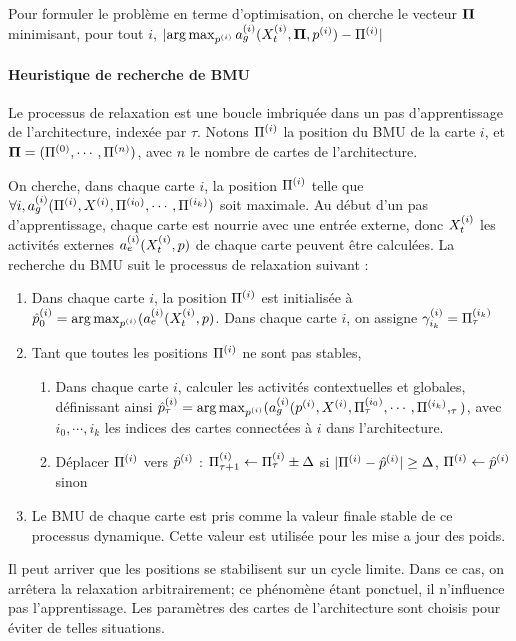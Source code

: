 Pour formuler le problème en terme d'optimisation, on cherche le vecteur $\mathbf{\Pi}$ minimisant, pour tout $i$, $\lvert \operatorname*{arg\,max}_{p^{({i})}} a_g^{({i})}(X^{({i})}_t, \mathbf{\Pi}, p^{({i})}) - \Pi^{({i})} \rvert$

\paragraph{Heuristique de recherche de BMU}
Le processus de relaxation est une boucle imbriquée dans un pas d'apprentissage de l'architecture, indexée par $\tau$. Notons $\Pi^{({i})}$ la position du BMU de la carte $i$, et $\mathbf{\Pi} = (\Pi^{({0})}, \cdots , \Pi^{({n})})$, avec $n$ le nombre de cartes de l'architecture.

On cherche, dans chaque carte $i$, la position $\Pi^{({i})}$ telle que $\forall i, a_g^{({i})}(\Pi^{({i})},X^{({i})},\Pi^{({i_0})},\cdots,\Pi^{({i_k})})$ soit maximale.
Au début d'un pas d'apprentissage, chaque carte est nourrie avec une entrée externe, donc $X^{({i})}_t$ les activités externes $a_e^{({i})}(X^{({i})}_t,p)$ de chaque carte peuvent être calculées.
La recherche du BMU suit le processus de relaxation suivant :
\begin{enumerate}
\item Dans chaque carte $i$, la position $\Pi^{({i})}$ est initialisée à $\hat{p}^{({i})}_0 = \operatorname*{arg\,max}_{p^{({i})}}(a_e^{({i})}(X^{({i})}_t,p)$. Dans chaque carte $i$, on assigne $\gamma_{i_k}^{({i})} = \Pi^{({i_k})}_\tau$
\item Tant que toutes les positions $\Pi^{({i})}$ ne sont pas stables, 
	\begin{enumerate}
	\item Dans chaque carte $i$, calculer les activités contextuelles et globales, définissant ainsi $\hat{p}^{({i})}_\tau = \operatorname*{arg\,max}_{p^{({i})}}(a_g^{({i})}(p^{({i})},X^{({i})}, \Pi^{({i_0})}_\tau,\cdots,\Pi^{({i_k})},_\tau)$, avec $i_0, \cdots, i_k$ les indices des cartes connectées à $i$ dans l'architecture.
	\item Déplacer $\Pi^{({i})}$ vers $\hat{p}^{({i})}$ : $\Pi^{({i})}_{\tau +1} \leftarrow \Pi^{({i})}_\tau \pm \Delta$ si $\lvert \Pi^{({i})}- \hat{p}^{({i})}\rvert \geq \Delta$, $\Pi^{({i})} \leftarrow \hat{p}^{({i})}$ sinon
	\end{enumerate}
\item Le BMU de chaque carte est pris comme la valeur finale stable de ce processus dynamique. Cette valeur est utilisée pour les mise a jour des poids.
\end{enumerate}

Il peut arriver que les positions se stabilisent sur un cycle limite. Dans ce cas, on arrêtera la relaxation arbitrairement; ce phénomène étant ponctuel, il n'influence pas l'apprentissage. Les paramètres des cartes de l'architecture sont choisis pour éviter de telles situations.

